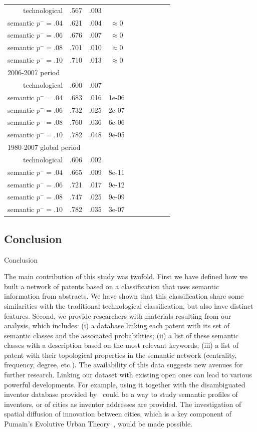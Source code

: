 \begin{table}[!ht]
\begin{tabular}{@{}rccccccccc@{}}
technological & .567 &.003&\\
semantic $p^{-} = .04$ & .621 &.004 & $\approx 0$\\
semantic $p^{-} = .06$ & .676 &.007 & $\approx 0$\\
semantic $p^{-} = .08$ & .701 &.010 & $\approx 0$\\
semantic $p^{-} = .10$ & .710 &.013 & $\approx 0$\\
\multicolumn{4}{l}{2006-2007 period} \\
technological & .600 &.007&\\
semantic $p^{-} = .04$ & .683 &.016 & 1e-06\\
semantic $p^{-} = .06$ & .732 &.025 & 2e-07\\
semantic $p^{-} = .08$ & .760 &.036 & 6e-06\\
semantic $p^{-} = .10$ & .782 &.048 &9e-05\\
\multicolumn{4}{l}{1980-2007 global period} \\
technological & .606 &.002&\\
semantic $p^{-} = .04$ & .665 &.009 & 8e-11\\
semantic $p^{-} = .06$ & .721 &.017 & 9e-12\\
semantic $p^{-} = .08$ & .747 &.025 & 9e-09\\
semantic $p^{-} = .10$ & .782 &.035 & 3e-07\\
\hline
\end{tabular}
\end{table}



\subsection*{Conclusion \label{discussion}}{Conclusion}

The main contribution of this study was twofold. First we have defined how we built a network of patents based on a classification that uses semantic information from abstracts. We have shown that this classification share some similarities with the traditional technological classification, but also have distinct features. Second, we provide researchers with materials resulting from our analysis, which includes: (i) a database linking each patent with its set of semantic classes and the associated probabilities; (ii) a list of these semantic classes with a description based on the most relevant keywords; (iii) a list of patent with their topological properties in the semantic network (centrality, frequency, degree, etc.). The availability of this data suggests new avenues for further research. Linking our dataset with existing open ones can lead to various powerful developments. For example, using it together with the disambiguated inventor database provided by~\cite{li2014disambiguation} could be a way to study semantic profiles of inventors, or of cities as inventor addresses are provided. The investigation of spatial diffusion of innovation between cities, which is a key component of Pumain's Evolutive Urban Theory~\cite{pumain2010theorie}, would be made possible.

